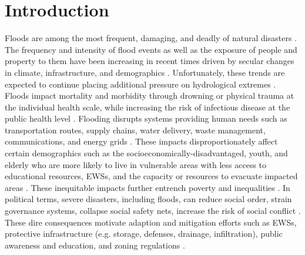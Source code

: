 \documentclass[water,article,submit,pdftex,moreauthors]{dependencies/Definitions/mdpi}
\begin{document}
\section{Introduction}
\label{sec:introduction}
%
\acresetall 
%
Floods are among the most frequent, damaging, and deadly of natural disasters \cite{doocy2013human,stromberg2007natural,kahn2005death}. 
The frequency and intensity of flood events as well as the exposure of people and property to them have been increasing in recent times driven by secular changes in climate, infrastructure, and demographics \cite{berz2000flood,mallakpour2015changing,downton2005reanalysis,kunkel1999temporal,pielke2000precipitation,corringham2019effect}. 
Unfortunately, these trends are expected to continue placing additional pressure on hydrological extremes \cite{kahn2005death,tabari2020climate,milly2002increasing,wing2018estimates}.
Floods impact mortality and morbidity through drowning or physical trauma at the individual health scale, while increasing the risk of infectious disease at the public health level \cite{jonkman2005global,beinin2012medical,alajo2006cholera,french1983mortality}.
Flooding disrupts systems providing human needs such as transportation routes, supply chains, water delivery, waste management, communications, and energy grids \cite{wijkman2021natural}.
These impacts disproportionately affect certain demographics such as the socioeconomically-disadvantaged, youth, and elderly who are more likely to live in vulnerable areas with less access to educational resources, \acp{EWS}, and the capacity or resources to evacuate impacted areas \cite{kahn2005death,smiley2022social,stromberg2007natural,jonkman2005global,tellman2020using,tellman2021satellite}.
These inequitable impacts further entrench poverty and inequalities \cite{stallings1988conflict,birkmann2010extreme}.
In political terms, severe disasters, including floods, can reduce social order, strain governance systems, collapse social safety nets, increase the risk of social conflict \cite{drury1998disasters,xu2016natural,zahran2009natural}.
These dire consequences motivate adaption and mitigation efforts such as \acp{EWS}, protective infrastructure (e.g. storage, defenses, drainage, infiltration), public awareness and education, and zoning regulations \cite{tumbare2000mitigating,tauhid2018mitigating,charlesworth201115}.
\end{document}
